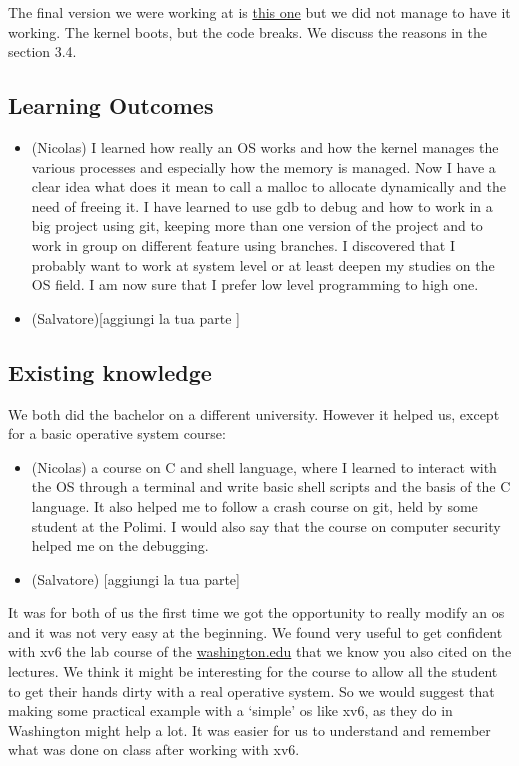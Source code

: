 \documentclass{article}
\begin{document}
The final version we were working at is \href{inserire link alla final version}{this one} but we did not manage to have it working. The kernel boots, but the code breaks. We discuss the reasons in the section 3.4.


\subsection{Learning Outcomes}

\begin{itemize}
    \item (Nicolas) I learned how really an OS works and how the kernel manages the various processes and especially how the memory is managed. Now I have a clear idea what does it mean to call a malloc to allocate  dynamically and the need of freeing it. I have learned to use gdb to debug and how to work in a big project using git, keeping more than one version of the project and to work in group on different feature using branches. I discovered that I probably want to work at system level or at least deepen my studies on the OS field. I am now sure that I prefer low level programming to high one.
    \item (Salvatore)[aggiungi la tua parte ]
\end{itemize}

 

\subsection{Existing knowledge}

We both did the bachelor on a different university. However it helped us, except for a basic operative system course:
\begin{itemize}
    \item (Nicolas) a course on C and shell language, where I learned to interact with the OS through a terminal and write basic shell scripts and the basis of the C language. It also helped me to follow a crash course on git, held by some student at the Polimi. I would also say that the course on computer security helped me on the debugging.
    \item(Salvatore) [aggiungi la tua parte]
\end{itemize}

It was for both of us the first time we got the opportunity to really modify an os and it was not very easy at the beginning. We found very useful to get confident with xv6 the lab course of the \href{https://courses.cs.washington.edu/courses/csep551/19au/labs/}{washington.edu} that we know you also cited on the lectures. We think it might be interesting for the course to allow all the student to get their hands dirty with a real operative system. So we would suggest that making some practical example with a ‘simple’ os like xv6, as they do in Washington might  help a lot. It was easier for us to understand and remember what was done on class after working with xv6.
\end{document}
